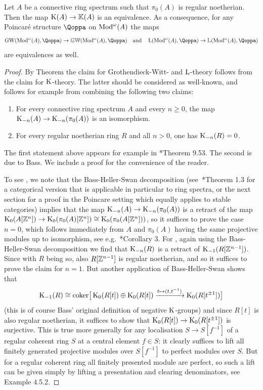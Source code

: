 \begin{corollary}
\label{corollary:regular-noetherian}%
Let $A$ be a connective ring spectrum such that $\pi_0(A)$ is regular noetherian. Then the map
$\operatorname K(A) \to \mathbb K(A)$ is an equivalence. As a consequence, for any Poincaré structure $\QF$ on $\operatorname{Mod}^{\omega}({A})$ the maps
\[
\GW(\Modp{A},\QF) \to \KGW(\Modp{A},\QF) \quad\text{and}\quad \L(\Modp{A},\QF) \to \KL(\Modp{A},\QF)
\]
are equivalences as well.
\end{corollary}
\begin{proof}
By Theorem  the claim for Grothendieck-Witt- and $\operatorname L$-theory follows from the claim for $\operatorname K$-theory.
The latter should be considered as well-known, and follows for example from combining the following two claims:
\begin{enumerate}
\item
\label{item:a}%
For every connective ring spectrum $A$ and every $n\geq 0$, the map $\operatorname K_{-n}(A) \to \operatorname K_{-n}(\pi_0(A))$ is an isomorphism. %
\item
\label{item:b}%
For every regular noetherian ring $R$ and all $n> 0$, one has $\operatorname K_{-n}(R) = 0$. %
\end{enumerate}
The first statement above appears for example in \cite{BGT}*{Theorem 9.53}. The second is due to Bass. We include a proof for the convenience of the reader.

To see , we note that the Bass-Heller-Swan decomposition (see~\cite{saunier}*{Theorem 1.3} for a categorical version that is applicable in particular to ring spectra, or the next section for a proof in the Poincare setting which equally applies to stable categories) %
implies that the map $\operatorname K_{-n}(A) \to \operatorname K_{-n}(\pi_0(A))$ is a retract of the map $\operatorname K_0(A[\mathbb{Z}^n]) \to \operatorname K_0(\pi_0(A)[\mathbb{Z}^n]) \cong \operatorname K_0(\pi_0(A[\mathbb{Z}^n]))$, so it suffices to prove the case $n=0$, which follows immediately from $A$ and $\pi_0(A)$ having the same projective modules up to isomorphism, see e.g.\ \cite{Lurie-K-theory}*{Corollary 3}. For , again using the Bass-Heller-Swan decomposition
we find that $\operatorname K_{-n}(R)$ is a retract of $\operatorname K_{-1}(R[\mathbb{Z}^{n-1}])$. Since with $R$ being so, also $R[\mathbb{Z}^{n-1}]$ is regular noetherian, 
and so it suffices to prove the claim for $n=1$. But another application of Bass-Heller-Swan %
shows that 
\[
\operatorname K_{-1}(R) \cong \mathrm{coker}\big[\operatorname K_0(R[t]) \oplus \operatorname K_0(R[t]) \xrightarrow{t \mapsto (t,t^{-1})} \operatorname K_0(R[t^{\pm 1}])\big]
\]
(this is of course Bass' original definition of negative $\operatorname K$-groups) and since $R[t]$ is also regular noetherian, 
it suffices to show that $\operatorname K_0(R[t]) \to \operatorname K_0(R[t^{\pm1}])$ is surjective. This is true more generally for any localisation $S \rightarrow S[f^{-1}]$ of a regular coherent ring $S$ at a central element $f \in S$: it clearly suffices to lift all finitely generated projective modules over $S[f^{-1}]$ to perfect modules over $S$. But for a regular coherent ring all finitely presented module are perfect, so such a lift can be given simply by lifting a presentation and clearing denominators, see \papertwo Example 4.5.2.
\end{proof}



